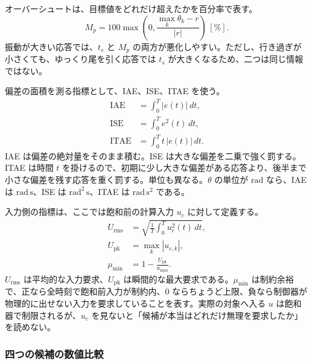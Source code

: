 オーバーシュートは、目標値をどれだけ超えたかを百分率で表す。
\begin{equation}
  M_p=
  100
  \max\left(
  0,\frac{\max_k\theta_k-r}{|r|}
  \right)\,[\%].
  \label{eq:overshoot-definition}
\end{equation}
振動が大きい応答では、$t_s$ と $M_p$ の両方が悪化しやすい。ただし、行き過ぎが小さくても、ゆっくり尾を引く応答では $t_s$ が大きくなるため、二つは同じ情報ではない。

偏差の面積を測る指標として、IAE、ISE、ITAE を使う。
\begin{align}
  \mathrm{IAE}
  &=\int_0^T |e(t)|\,dt,\\
  \mathrm{ISE}
  &=\int_0^T e^2(t)\,dt,\\
  \mathrm{ITAE}
  &=\int_0^T t\,|e(t)|\,dt .
  \label{eq:error-integral-indices}
\end{align}
IAE は偏差の絶対量をそのまま積む。ISE は大きな偏差を二乗で強く罰する。ITAE は時間 $t$ を掛けるので、初期に少し大きな偏差がある応答より、後半まで小さな偏差を残す応答を重く罰する。単位も異なる。$\theta$ の単位が $\mathrm{rad}$ なら、IAE は $\mathrm{rad\,s}$、ISE は $\mathrm{rad^2\,s}$、ITAE は $\mathrm{rad\,s^2}$ である。

入力側の指標は、ここでは飽和前の計算入力 $u_c$ に対して定義する。
\begin{align}
  U_{\mathrm{rms}}
  &=
  \sqrt{\frac{1}{T}\int_0^T u_c^2(t)\,dt},\\
  U_{\mathrm{pk}}
  &=\max_k |u_{c,k}|,\\
  \mu_{\min}
  &=
  1-\frac{U_{\mathrm{pk}}}{u_{\max}} .
  \label{eq:input-indices-margin}
\end{align}
$U_{\mathrm{rms}}$ は平均的な入力要求、$U_{\mathrm{pk}}$ は瞬間的な最大要求である。$\mu_{\min}$ は制約余裕で、正なら全時刻で飽和前入力が制約内、0 ならちょうど上限、負なら制御器が物理的に出せない入力を要求していることを表す。実際の対象へ入る $u$ は飽和器で制限されるが、$u_c$ を見ないと「候補が本当はどれだけ無理を要求したか」を読めない。

\subsubsection{四つの候補の数値比較}


